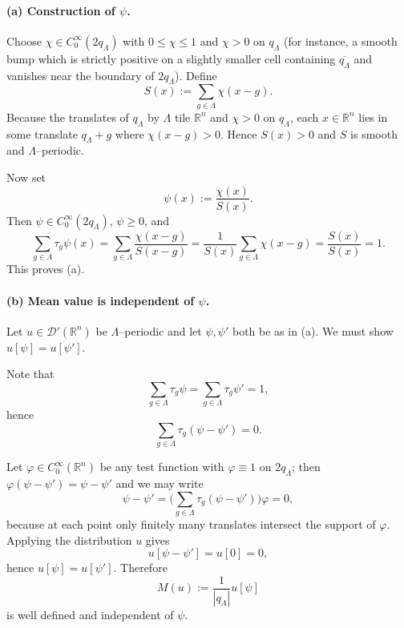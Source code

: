 \documentclass[12pt,a4paper]{article}
\theoremstyle{plain}
\theoremstyle{definition}
\theoremstyle{remark}
\theoremstyle{remark}
\begin{document}
	\paragraph{(a) Construction of $\psi$.}
	
	Choose $\chi\in C_0^\infty(2q_\Lambda)$ with $0\le\chi\le 1$ and
	$\chi>0$ on $q_\Lambda$ (for instance, a smooth bump which is strictly
	positive on a slightly smaller cell containing $\overline{q_\Lambda}$
	and vanishes near the boundary of $2q_\Lambda$).  Define
	\[
	S(x) := \sum_{g\in\Lambda} \chi(x-g).
	\]
	Because the translates of $q_\Lambda$ by $\Lambda$ tile $\mathbb{R}^n$
	and $\chi>0$ on $q_\Lambda$, each $x\in\mathbb{R}^n$ lies in some
	translate $q_\Lambda+g$ where $\chi(x-g)>0$.  Hence $S(x)>0$ and $S$ is
	smooth and $\Lambda$–periodic.
	
	Now set
	\[
	\psi(x) := \frac{\chi(x)}{S(x)}.
	\]
	Then $\psi\in C_0^\infty(2q_\Lambda)$, $\psi\ge 0$, and
	\[
	\sum_{g\in\Lambda} \tau_g\psi(x)
	= \sum_{g\in\Lambda} \frac{\chi(x-g)}{S(x-g)}
	= \frac{1}{S(x)}\sum_{g\in\Lambda}\chi(x-g)
	= \frac{S(x)}{S(x)} = 1.
	\]
	This proves (a).
	
	\bigskip
	
	
	\paragraph{(b) Mean value is independent of $\psi$.}
	
	Let $u\in\mathcal{D}'(\mathbb{R}^n)$ be $\Lambda$–periodic and let
	$\psi,\psi'$ both be as in (a).  We must show $u[\psi]=u[\psi']$.
	
	Note that
	\[
	\sum_{g\in\Lambda} \tau_g\psi
	= \sum_{g\in\Lambda} \tau_g\psi' = 1,
	\]
	hence
	\[
	\sum_{g\in\Lambda} \tau_g(\psi-\psi') = 0.
	\]
	
	Let $\varphi\in C_0^\infty(\mathbb{R}^n)$ be any test function with
	$\varphi\equiv 1$ on $2q_\Lambda$; then $\varphi(\psi-\psi')=\psi-\psi'$
	and we may write
	\[
	\psi - \psi'
	= \biggl(\sum_{g\in\Lambda} \tau_g(\psi-\psi')\biggr)\varphi = 0,
	\]
	because at each point only finitely many translates intersect the
	support of $\varphi$.  Applying the distribution $u$ gives
	\[
	u[\psi-\psi']
	= u[0] = 0,
	\]
	hence $u[\psi]=u[\psi']$.  Therefore
	\[
	M(u) := \frac{1}{|q_\Lambda|}u[\psi]
	\]
	is well defined and independent of $\psi$.
	
\end{document}

